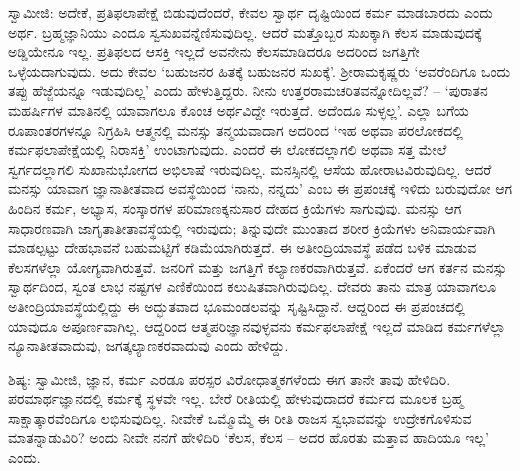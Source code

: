 ಸ್ವಾಮೀಜಿ: ಅದೇಕೆ, ಪ್ರತಿಫಲಾಪೇಕ್ಷೆ ಬಿಡುವುದೆಂದರೆ, ಕೇವಲ ಸ್ವಾರ್ಥ ದೃಷ್ಟಿಯಿಂದ ಕರ್ಮ ಮಾಡಬಾರದು ಎಂದು ಅರ್ಥ. ಬ್ರಹ್ಮಜ್ಞಾನಿಯು ಎಂದೂ ಸ್ವಸುಖವನ್ನೆಣಿಸುವುದಿಲ್ಲ. ಆದರೆ ಮತ್ತೊಬ್ಬರ ಸುಖಕ್ಕಾಗಿ ಕೆಲಸ ಮಾಡುವುದಕ್ಕೆ ಅಡ್ಡಿಯೇನೂ ಇಲ್ಲ. ಪ್ರತಿಫಲದ ಆಸಕ್ತಿ ಇಲ್ಲದೆ ಅವನೇನು ಕೆಲಸಮಾಡಿದರೂ ಅದರಿಂದ ಜಗತ್ತಿಗೇ ಒಳ್ಳೆಯದಾಗುವುದು. ಅದು ಕೇವಲ ‘ಬಹುಜನರ ಹಿತಕ್ಕೆ ಬಹುಜನರ ಸುಖಕ್ಕೆ’. ಶ‍್ರೀರಾಮಕೃಷ್ಣರು ‘ಅವರೆಂದಿಗೂ ಒಂದು ತಪ್ಪು ಹೆಜ್ಜೆಯನ್ನೂ ಇಡುವುದಿಲ್ಲ’ ಎಂದು ಹೇಳುತ್ತಿದ್ದರು. ನೀನು ಉತ್ತರರಾಮಚರಿತವನ್ನೋದಿಲ್ಲವೆ? – ‘ಪುರಾತನ ಮಹರ್ಷಿಗಳ ಮಾತಿನಲ್ಲಿ ಯಾವಾಗಲೂ ಕೊಂಚ ಅರ್ಥವಿದ್ದೇ ಇರುತ್ತದೆ. ಅದೆಂದೂ ಸುಳ್ಳಲ್ಲ’. ಎಲ್ಲಾ ಬಗೆಯ ರೂಪಾಂತರಗಳನ್ನೂ ನಿಗ್ರಹಿಸಿ ಆತ್ಮನಲ್ಲಿ ಮನಸ್ಸು ತನ್ಮಯವಾದಾಗ ಅದರಿಂದ ‘ಇಹ ಅಥವಾ ಪರಲೋಕದಲ್ಲಿ ಕರ್ಮಫಲಾಪೇಕ್ಷೆಯಲ್ಲಿ ನಿರಾಸಕ್ತಿ’ ಉಂಟಾಗುವುದು. ಎಂದರೆ ಈ ಲೋಕದಲ್ಲಾಗಲಿ ಅಥವಾ ಸತ್ತ ಮೇಲೆ ಸ್ವರ್ಗದಲ್ಲಾಗಲಿ ಸುಖಾನುಭೋಗದ ಅಭಿಲಾಷೆ ಇರುವುದಿಲ್ಲ. ಮನಸ್ಸಿನಲ್ಲಿ ಆಸೆಯ ಹೋರಾಟವಿರುವುದಿಲ್ಲ. ಆದರೆ ಮನಸ್ಸು ಯಾವಾಗ ಜ್ಞಾನಾತೀತವಾದ ಅವಸ್ಥೆಯಿಂದ ‘ನಾನು, ನನ್ನದು’ ಎಂಬ ಈ ಪ್ರಪಂಚಕ್ಕೆ ಇಳಿದು ಬರುವುದೋ ಆಗ ಹಿಂದಿನ ಕರ್ಮ, ಅಭ್ಯಾಸ, ಸಂಸ್ಕಾರಗಳ ಪರಿಮಾಣಕ್ಕನುಸಾರ ದೇಹದ ಕ್ರಿಯೆಗಳು ಸಾಗುವುವು. ಮನಸ್ಸು ಆಗ ಸಾಧಾರಣವಾಗಿ ಜಾಗೃತಾತೀತಾವಸ್ಥೆಯಲ್ಲಿ ಇರುವುದು; ತಿನ್ನುವುದೇ ಮುಂತಾದ ಶರೀರ ಕ್ರಿಯೆಗಳು ಅನಿವಾರ್ಯವಾಗಿ ಮಾಡಲ್ಪಟ್ಟು ದೇಹಭಾವನೆ ಬಹುಮಟ್ಟಿಗೆ ಕಡಿಮೆಯಾಗಿರುತ್ತದೆ. ಈ ಅತೀಂದ್ರಿಯಾವಸ್ಥೆ ಪಡೆದ ಬಳಿಕ ಮಾಡುವ ಕೆಲಸಗಳೆಲ್ಲಾ ಯೋಗ್ಯವಾಗಿರುತ್ತವೆ. ಜನರಿಗೆ ಮತ್ತು ಜಗತ್ತಿಗೆ ಕಲ್ಯಾಣಕರವಾಗಿರುತ್ತವೆ. ಏಕೆಂದರೆ ಆಗ ಕರ್ತನ ಮನಸ್ಸು ಸ್ವಾರ್ಥದಿಂದ, ಸ್ವಂತ ಲಾಭ ನಷ್ಟಗಳ ಎಣಿಕೆಯಿಂದ ಕಲುಷಿತವಾಗಿರುವುದಿಲ್ಲ. ದೇವರು ತಾನು ಮಾತ್ರ ಯಾವಾಗಲೂ ಅತೀಂದ್ರಿಯಾವಸ್ಥೆಯಲ್ಲಿದ್ದು ಈ ಅದ್ಭುತವಾದ ಭೂಮಂಡಲವನ್ನು ಸೃಷ್ಟಿಸಿದ್ದಾನೆ. ಆದ್ದರಿಂದ ಈ ಪ್ರಪಂಚದಲ್ಲಿ ಯಾವುದೂ ಅಪೂರ್ಣವಾಗಿಲ್ಲ. ಆದ್ದರಿಂದ ಆತ್ಮಪರಿಜ್ಞಾನವುಳ್ಳವನು ಕರ್ಮಫಲಾಪೇಕ್ಷೆ ಇಲ್ಲದೆ ಮಾಡಿದ ಕರ್ಮಗಳೆಲ್ಲಾ ನ್ಯೂನಾತೀತವಾದುವು, ಜಗತ್ಕಲ್ಯಾಣಕರವಾದುವು ಎಂದು ಹೇಳಿದ್ದು.

ಶಿಷ್ಯ: ಸ್ವಾಮೀಜಿ, ಜ್ಞಾನ, ಕರ್ಮ ಎರಡೂ ಪರಸ್ಪರ ವಿರೋಧಾತ್ಮಕಗಳೆಂದು ಈಗ ತಾನೇ ತಾವು ಹೇಳಿದಿರಿ. ಪರಮಾರ್ಥಜ್ಞಾನದಲ್ಲಿ ಕರ್ಮಕ್ಕೆ ಸ್ಥಳವೇ ಇಲ್ಲ. ಬೇರೆ ರೀತಿಯಲ್ಲಿ ಹೇಳುವುದಾದರೆ ಕರ್ಮದ ಮೂಲಕ ಬ್ರಹ್ಮ ಸಾಕ್ಷಾತ್ಕಾರವೆಂದಿಗೂ ಲಭಿಸುವುದಿಲ್ಲ. ನೀವೇಕೆ ಒಮ್ಮೊಮ್ಮೆ ಈ ರೀತಿ ರಾಜಸ ಸ್ವಭಾವವನ್ನು ಉದ್ರೇಕಗೊಳಿಸುವ ಮಾತನ್ನಾಡುವಿರಿ? ಅಂದು ನೀವೇ ನನಗೆ ಹೇಳಿದಿರಿ ‘ಕೆಲಸ, ಕೆಲಸ – ಅದರ ಹೊರತು ಮತ್ತಾವ ಹಾದಿಯೂ ಇಲ್ಲ’ ಎಂದು.

